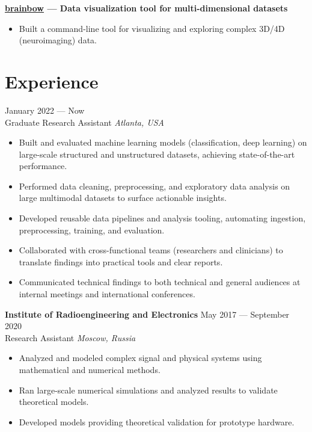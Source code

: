 \documentclass[11pt,a4paper]{article}
\begin{document}
\noindent\textbf{\href{https://pypi.org/project/brainbow/}{brainbow} --- Data visualization tool for multi-dimensional datasets}\\
[-2em]
\begin{itemize}[leftmargin=*,noitemsep]
    \item Built a command-line tool for visualizing and exploring complex 3D/4D (neuroimaging) data.
\end{itemize}

\section*{Experience}
 \hfill January 2022 --- Now\\
Graduate Research Assistant \hfill \textit{Atlanta, USA}\\
[-2em]
\begin{itemize}[leftmargin=*,noitemsep]
    \item Built and evaluated machine learning models (classification, deep learning) on large-scale structured and unstructured datasets, achieving state-of-the-art performance.
    \item Performed data cleaning, preprocessing, and exploratory data analysis on large multimodal datasets to surface actionable insights.
    \item Developed reusable data pipelines and analysis tooling, automating ingestion, preprocessing, training, and evaluation.
    \item Collaborated with cross-functional teams (researchers and clinicians) to translate findings into practical tools and clear reports.
    \item Communicated technical findings to both technical and general audiences at internal meetings and international conferences.
\end{itemize}

\noindent\textbf{Institute of Radioengineering and Electronics} \hfill May 2017 --- September 2020\\
Research Assistant \hfill \textit{Moscow, Russia}\\
[-2em]
\begin{itemize}[leftmargin=*,noitemsep]
    \item Analyzed and modeled complex signal and physical systems using mathematical and numerical methods.
    \item Ran large-scale numerical simulations and analyzed results to validate theoretical models.
    \item Developed models providing theoretical validation for prototype hardware.
\end{itemize}
\end{document}
